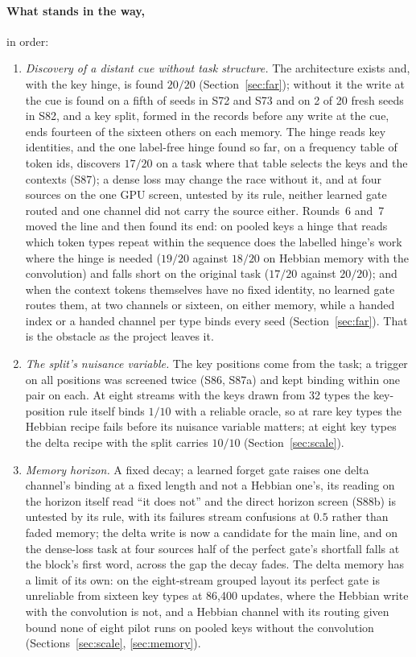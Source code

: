 \documentclass[11pt]{article}
\begin{document}
\paragraph{What stands in the way,} in order:
\begin{enumerate}
\item \emph{Discovery of a distant cue without task structure.} The architecture exists and, with the key hinge, is found $20/20$ (Section~\ref{sec:far}); without it the write at the cue is found on a fifth of seeds in S72 and S73 and on 2 of 20 fresh seeds in S82, and a key split, formed in the records before any write at the cue, ends fourteen of the sixteen others on each memory. The hinge reads key identities, and the one label-free hinge found so far, on a frequency table of token ids, discovers $17/20$ on a task where that table selects the keys and the contexts (S87); a dense loss may change the race without it, and at four sources on the one GPU screen, untested by its rule, neither learned gate routed and one channel did not carry the source either. Rounds~6 and~7 moved the line and then found its end: on pooled keys a hinge that reads which token types repeat within the sequence does the labelled hinge's work where the hinge is needed ($19/20$ against $18/20$ on Hebbian memory with the convolution) and falls short on the original task ($17/20$ against $20/20$); and when the context tokens themselves have no fixed identity, no learned gate routes them, at two channels or sixteen, on either memory, while a handed index or a handed channel per type binds every seed (Section~\ref{sec:far}). That is the obstacle as the project leaves it.
\item \emph{The split's nuisance variable.} The key positions come from the task; a trigger on all positions was screened twice (S86, S87a) and kept binding within one pair on each. At eight streams with the keys drawn from 32 types the key-position rule itself binds $1/10$ with a reliable oracle, so at rare key types the Hebbian recipe fails before its nuisance variable matters; at eight key types the delta recipe with the split carries $10/10$ (Section~\ref{sec:scale}).
\item \emph{Memory horizon.} A fixed decay; a learned forget gate raises one delta channel's binding at a fixed length and not a Hebbian one's, its reading on the horizon itself read ``it does not'' and the direct horizon screen (S88b) is untested by its rule, with its failures stream confusions at $0.5$ rather than faded memory; the delta write is now a candidate for the main line, and on the dense-loss task at four sources half of the perfect gate's shortfall falls at the block's first word, across the gap the decay fades. The delta memory has a limit of its own: on the eight-stream grouped layout its perfect gate is unreliable from sixteen key types at 86{,}400 updates, where the Hebbian write with the convolution is not, and a Hebbian channel with its routing given bound none of eight pilot runs on pooled keys without the convolution (Sections~\ref{sec:scale}, \ref{sec:memory}).

\end{enumerate}
\end{document}
